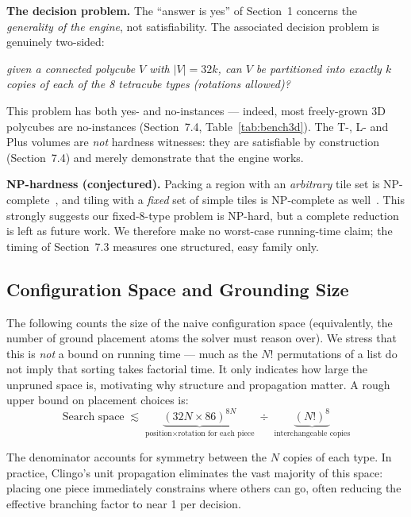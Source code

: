 \documentclass[12pt,a4paper]{article}
\begin{document}
\textbf{The decision problem.}  The ``answer is yes'' of Section~1 concerns the
\emph{generality of the engine}, not satisfiability.  The associated decision
problem is genuinely two-sided:

\begin{center}
\emph{given a connected polycube $V$ with $|V| = 32k$, can $V$ be partitioned
into exactly $k$ copies of each of the 8 tetracube types (rotations allowed)?}
\end{center}

This problem has both yes- and no-instances --- indeed, most freely-grown 3D
polycubes are no-instances (Section~7.4, Table~\ref{tab:bench3d}).  The T-, L-
and Plus volumes are \emph{not} hardness witnesses: they are satisfiable by
construction (Section~7.4) and merely demonstrate that the engine works.

\textbf{NP-hardness (conjectured).}  Packing a region with an \emph{arbitrary}
tile set is NP-complete~\cite{demaine2007,gareyjohnson1979}, and tiling with a
\emph{fixed} set of simple tiles is NP-complete as well~\cite{moore2001}.  This
strongly suggests our fixed-8-type problem is NP-hard, but a complete reduction
is left as future work.  We therefore make no worst-case running-time claim;
the timing of Section~7.3 measures one structured, easy family only.

\subsection{Configuration Space and Grounding Size}

The following counts the size of the naive configuration space (equivalently,
the number of ground placement atoms the solver must reason over).  We stress
that this is \emph{not} a bound on running time --- much as the $N!$ permutations
of a list do not imply that sorting takes factorial time.  It only indicates how
large the unpruned space is, motivating why structure and propagation matter.
A rough upper bound on placement choices is:
\[
  \text{Search space} \;\lesssim\;
  \underbrace{(32N \times 86)^{8N}}_{\text{position} \times \text{rotation for each piece}}
  \;\div\;
  \underbrace{(N!)^8}_{\text{interchangeable copies}}
\]

The denominator accounts for symmetry between the $N$ copies of each type.
In practice, Clingo's unit propagation eliminates the vast majority of this
space: placing one piece immediately constrains where others can go, often
reducing the effective branching factor to near 1 per decision.
\end{document}
